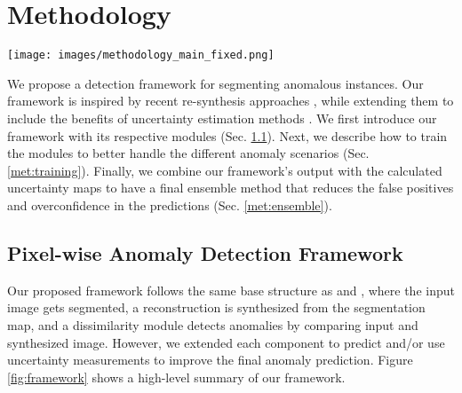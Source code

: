 \documentclass[final]{cvpr}
\begin{document}
%
 \section{Methodology}
\label{methodolgy}





\begin{figure*}[!th]
\begin{center}
   \texttt{[image: images/methodology\_main\_fixed.png]}
\vspace{-5mm}
\end{center}
   \caption{\textbf{Anomaly Segmentation Framework}. We first pass the input image through a segmentation network, which will output a semantic map and two uncertainty maps. The predicted semantic map is then processed by the synthesis network to generate a photo-realistic image. Perceptual difference is then calculated by comparing features between the input and generated images. Lastly, all the predicted images and the input are sent to the spatial-aware dissimilarity module to produce the anomaly prediction.}
\label{fig:framework}
\vspace{-4mm}
\end{figure*}

We propose a detection framework for segmenting anomalous instances. Our framework is inspired by recent re-synthesis approaches \cite{epfl,synthesize_compare}, while extending them to include the benefits of uncertainty estimation methods \cite{meta_ood,meta}. 
We first introduce our framework with its respective modules (Sec. \ref{met:framework}). Next, we describe how to train the modules to better handle the different anomaly scenarios (Sec. \ref{met:training}). Finally, we combine our framework's output with the calculated uncertainty maps to have a final ensemble method that reduces the false positives and overconfidence in the predictions (Sec. \ref{met:ensemble}). 




\subsection{Pixel-wise Anomaly Detection Framework}
\label{met:framework}


Our proposed framework follows the same base structure as \cite{epfl} and \cite{master_thesis_old}, where the input image gets segmented, a reconstruction is synthesized from the segmentation map, and a dissimilarity module detects anomalies by comparing input and synthesized image. However, we extended each component to predict and/or use uncertainty measurements to improve the final anomaly prediction. Figure \ref{fig:framework} shows a high-level summary of our framework. 
\end{document}
